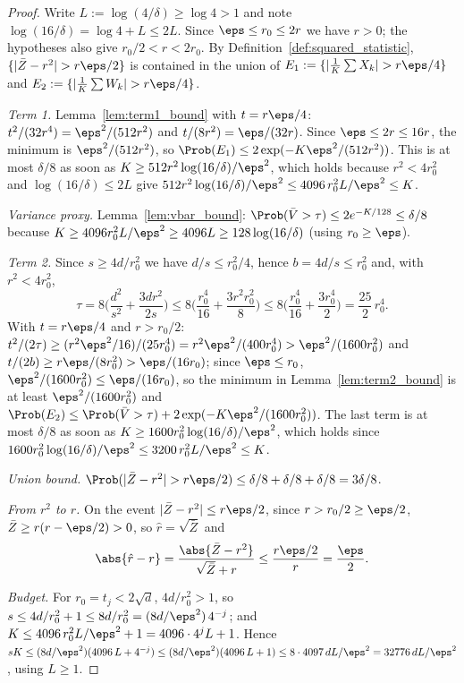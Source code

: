 \begin{proof}
\leanok
{}
Write $L := \log(4/\delta) \ge \log 4 > 1$ and note $\log(16/\delta) = \log 4 + L \le 2L$.
Since $\eps \le r_0 \le 2r$ we have $r > 0$; the hypotheses also give $r_0/2 < r < 2r_0$. By
Definition~\ref{def:squared_statistic}, $\{|\bar Z - r^2| > r\eps/2\}$ is contained in the
union of $E_1 := \{|\frac1K\sum X_k| > r\eps/4\}$ and $E_2 := \{|\frac1K\sum W_k| > r\eps/4\}$.

\emph{Term 1.} Lemma~\ref{lem:term1_bound} with $t = r\eps/4$: $t^2/(32r^4) = \eps^2/(512r^2)$
and $t/(8r^2) = \eps/(32r)$. Since $\eps \le 2r \le 16r$, the minimum is $\eps^2/(512r^2)$,
so $\Prob(E_1) \le 2\exp(-K\eps^2/(512r^2))$. This is at most $\delta/8$ as soon as
$K \ge 512r^2\log(16/\delta)/\eps^2$, which holds because $r^2 < 4r_0^2$ and
$\log(16/\delta) \le 2L$ give $512r^2\log(16/\delta)/\eps^2 \le 4096\,r_0^2L/\eps^2 \le K$.

\emph{Variance proxy.} Lemma~\ref{lem:vbar_bound}: $\Prob(\bar V > \tau) \le 2e^{-K/128} \le \delta/8$
because $K \ge 4096 r_0^2L/\eps^2 \ge 4096 L \ge 128\log(16/\delta)$ (using $r_0 \ge \eps$).

\emph{Term 2.} Since $s \ge 4d/r_0^2$ we have $d/s \le r_0^2/4$, hence $b = 4d/s \le r_0^2$ and,
with $r^2 < 4r_0^2$,
\[
  \tau = 8\Big( \frac{d^2}{s^2} + \frac{3dr^2}{2s} \Big)
  \le 8\Big( \frac{r_0^4}{16} + \frac{3 r^2 r_0^2}{8} \Big)
  \le 8\Big( \frac{r_0^4}{16} + \frac{3 r_0^4}{2} \Big) = \frac{25}{2}\,r_0^4 .
\]
With $t = r\eps/4$ and $r > r_0/2$:
$t^2/(2\tau) \ge (r^2\eps^2/16)/(25r_0^4) = r^2\eps^2/(400r_0^4) > \eps^2/(1600 r_0^2)$ and
$t/(2b) \ge r\eps/(8r_0^2) > \eps/(16r_0)$; since $\eps \le r_0$,
$\eps^2/(1600r_0^2) \le \eps/(16r_0)$, so the minimum in Lemma~\ref{lem:term2_bound} is at
least $\eps^2/(1600r_0^2)$ and
$\Prob(E_2) \le \Prob(\bar V > \tau) + 2\exp(-K\eps^2/(1600r_0^2))$. The last term is at
most $\delta/8$ as soon as $K \ge 1600r_0^2\log(16/\delta)/\eps^2$, which holds since
$1600r_0^2\log(16/\delta)/\eps^2 \le 3200\,r_0^2L/\eps^2 \le K$.

\emph{Union bound.} $\Prob(|\bar Z - r^2| > r\eps/2) \le \delta/8 + \delta/8 + \delta/8 = 3\delta/8$.

\emph{From $r^2$ to $r$.} On the event $|\bar Z - r^2| \le r\eps/2$, since $r > r_0/2 \ge \eps/2$,
$\bar Z \ge r(r - \eps/2) > 0$, so $\hat r = \sqrt{\bar Z}$ and
\[
  \abs{\hat r - r} = \frac{\abs{\bar Z - r^2}}{\sqrt{\bar Z} + r} \le \frac{r\eps/2}{r} = \frac{\eps}{2}.
\]

\emph{Budget.} For $r_0 = t_j < 2\sqrt d$, $4d/r_0^2 > 1$, so
$s \le 4d/r_0^2 + 1 \le 8d/r_0^2 = (8d/\eps^2)\,4^{-j}$; and
$K \le 4096\,r_0^2L/\eps^2 + 1 = 4096\cdot 4^j L + 1$. Hence
$sK \le (8d/\eps^2)(4096\,L + 4^{-j}) \le (8d/\eps^2)(4096\,L + 1) \le 8\cdot 4097\, dL/\eps^2
= 32776\, dL/\eps^2$, using $L \ge 1$.
\end{proof}

